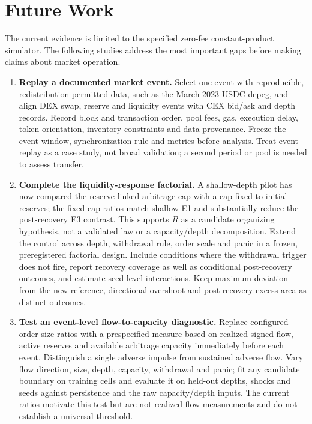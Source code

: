 \chapter{Future Work}
\label{cap:futuro}

The current evidence is limited to the specified zero-fee constant-product simulator. The following studies address the most important gaps before making claims about market operation.

\begin{enumerate}
  \item \textbf{Replay a documented market event.} Select one event with reproducible, redistribution-permitted data, such as the March 2023 USDC depeg, and align DEX swap, reserve and liquidity events with CEX bid/ask and depth records. Record block and transaction order, pool fees, gas, execution delay, token orientation, inventory constraints and data provenance. Freeze the event window, synchronization rule and metrics before analysis. Treat event replay as a case study, not broad validation; a second period or pool is needed to assess transfer.
  \item \textbf{Complete the liquidity-response factorial.} A shallow-depth pilot has now compared the reserve-linked arbitrage cap with a cap fixed to initial reserves; the fixed-cap ratios match shallow E1 and substantially reduce the post-recovery E3 contrast. This supports $R$ as a candidate organizing hypothesis, not a validated law or a capacity/depth decomposition. Extend the control across depth, withdrawal rule, order scale and panic in a frozen, preregistered factorial design. Include conditions where the withdrawal trigger does not fire, report recovery coverage as well as conditional post-recovery outcomes, and estimate seed-level interactions. Keep maximum deviation from the new reference, directional overshoot and post-recovery excess area as distinct outcomes.
  \item \textbf{Test an event-level flow-to-capacity diagnostic.} Replace configured order-size ratios with a prespecified measure based on realized signed flow, active reserves and available arbitrage capacity immediately before each event. Distinguish a single adverse impulse from sustained adverse flow. Vary flow direction, size, depth, capacity, withdrawal and panic; fit any candidate boundary on training cells and evaluate it on held-out depths, shocks and seeds against persistence and the raw capacity/depth inputs. The current ratios motivate this test but are not realized-flow measurements and do not establish a universal threshold.

\end{enumerate}
